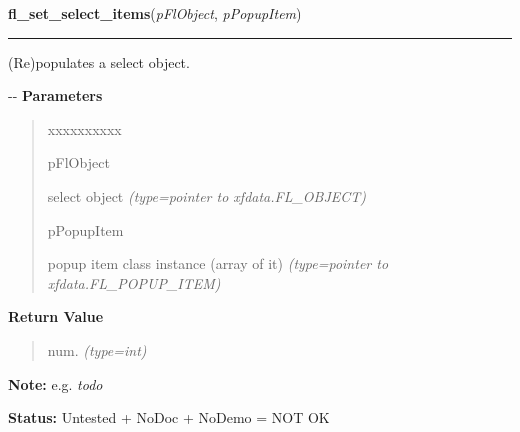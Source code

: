     \vspace{0.5ex}

\hspace{.8\funcindent}\begin{boxedminipage}{\funcwidth}

    \raggedright \textbf{fl\_set\_select\_items}(\textit{pFlObject}, \textit{pPopupItem})

    \vspace{-1.5ex}

    \rule{\textwidth}{0.5\fboxrule}
\setlength{\parskip}{2ex}

(Re)populates a select object.

-{}-
\setlength{\parskip}{1ex}
      \textbf{Parameters}
      \vspace{-1ex}

      \begin{quote}
        \begin{Ventry}{xxxxxxxxxx}

          \item[pFlObject]


select object
            {\it (type=pointer to xfdata.FL\_OBJECT)}

          \item[pPopupItem]


popup item class instance (array of it)
            {\it (type=pointer to xfdata.FL\_POPUP\_ITEM)}

        \end{Ventry}

      \end{quote}

      \textbf{Return Value}
    \vspace{-1ex}

      \begin{quote}

num.
      {\it (type=int)}

      \end{quote}

\textbf{Note:} 
e.g. \emph{todo}


\textbf{Status:} 
Untested + NoDoc + NoDemo = NOT OK


    \end{boxedminipage}

    \label{xformslib:flselect:fl_get_select_popup}

    \vspace{0.5ex}

